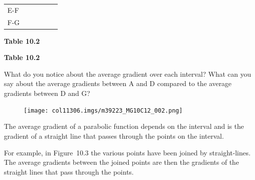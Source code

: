 \begin{table}[H]
\begin{center}
\begin{xtabular}[t]{|l|l|l|l|l|l|}
        E-F &
         &
         &
         &
         &
     \tabularnewline{}
        F-G &
         &
         &
         &
         &
     \tabularnewline{}
    \end{xtabular}
      \end{center}
    \begin{center}{\small\bfseries Table 10.2}\end{center}
    \begin{caption}{\small\bfseries Table 10.2}\end{caption}
\end{table}
    \par
      \label{m39223*id190636}
What do you notice about the average gradient over each interval? What can you
say about the average gradients between A and D compared to the average
gradients between D and G?\par 
      \label{m39223*id190641}
    \setcounter{subfigure}{0}
	\begin{figure}[H] %
    \begin{center}
    \label{m39223*id190642!!!underscore!!!media}\label{m39223*id190642!!!underscore!!!printimage}\texttt{[image: col11306.imgs/m39223\_MG10C12\_002.png]} %
      \vspace{2pt}
    \vspace{.1in}
    \end{center}
 \end{figure}       
      \par 
      \label{m39223*id190657}The average gradient of a parabolic function depends on the interval and is the gradient of a straight line that passes through the points on the interval.\par 
      \label{m39223*id190661}For example, in Figure~10.3 the various points have been joined by straight-lines. The average gradients between the joined points are then the gradients of the straight lines that pass through the points.\par 
    \setcounter{subfigure}{0}
